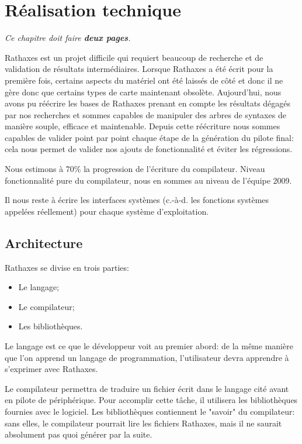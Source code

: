 \documentclass[francais]{rtxreport}
\begin{document}

\chapter{Réalisation technique}

\emph{Ce chapitre doit faire \textbf{deux pages}.}

Rathaxes est un projet difficile qui requiert beaucoup de recherche et de
validation de résultats intermédiaires.  Lorsque Rathaxes a été écrit pour la
première fois, certains aspects du matériel ont été laissés de côté et donc il
ne gère donc que certains types de carte maintenant obsolète. Aujourd'hui, nous
avons pu réécrire les bases de Rathaxes prenant en compte les résultats dégagés
par nos recherches et sommes capables de manipuler des arbres de syntaxes de
manière souple, efficace et maintenable. Depuis cette réécriture nous sommes
capables de valider point par point chaque étape de la génération du pilote
final: cela nous permet de valider nos ajouts de fonctionnalité et éviter les
régressions.

Nous estimons à 70\% la progression de l’écriture du compilateur. Niveau
fonctionnalité pure du compilateur, nous en sommes au niveau de l'équipe 2009.

Il nous reste à écrire les interfaces systèmes (c.-à-d. les fonctions systèmes
appelées réellement) pour chaque système d’exploitation.



\section{Architecture}
Rathaxes se divise en trois parties:
\begin{itemize}
	\item Le langage;
	\item Le compilateur;
	\item Les bibliothèques.
\end{itemize}

Le langage est ce que le développeur voit au premier abord: de la même manière
que l’on apprend un langage de programmation, l’utilisateur devra apprendre à
s’exprimer avec Rathaxes.

Le compilateur permettra de traduire un fichier écrit dans le langage cité
avant en pilote de périphérique. Pour accomplir cette tâche, il utilisera les
bibliothèques fournies avec le logiciel.  Les bibliothèques contiennent le
"savoir" du compilateur: sans elles, le compilateur pourrait lire les fichiers
Rathaxes, mais il ne saurait absolument pas quoi générer par la suite.
\end{document}
